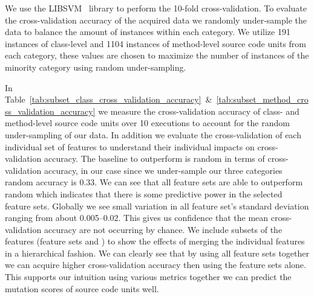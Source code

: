 We use the LIBSVM~\cite{CL11} library to perform the 10-fold cross-validation. To evaluate the cross-validation accuracy of the acquired data we randomly under-sample the data to balance the amount of instances within each category. We utilize 191 instances of class-level and 1104 instances of method-level source code units from each category, these values are chosen to maximize the number of instances of the minority category using random under-sampling.

In Table~\ref{tab:subset_class_cross_validation_accuracy}~\&~\ref{tab:subset_method_cross_validation_accuracy} we measure the cross-validation accuracy of class- and method-level source code units over 10 executions to account for the random under-sampling of our data. In addition we evaluate the cross-validation of each individual set of features to understand their individual impacts on cross-validation accuracy. The baseline to outperform is random in terms of cross-validation accuracy, in our case since we under-sample our three categories random accuracy is 0.33. We can see that all feature sets are able to outperform random which indicates that there is some predictive power in the selected feature sets. Globally we see small variation in all feature set's standard deviation ranging from about 0.005--0.02. This gives us confidence that the mean cross-validation accuracy are not occurring by chance. We include subsets of the features (feature sets    and  ) to show the effects of merging the individual features in a hierarchical fashion. We can clearly see that by using all feature sets together we can acquire higher cross-validation accuracy then using the feature sets alone. This supports our intuition using various metrics together we can predict the mutation scores of source code units well.

